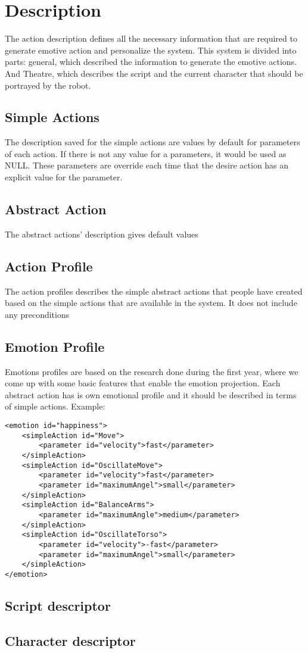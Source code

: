 \section{Description}
The action description defines all the necessary information that are required to generate emotive action and personalize the system. This system is divided into parts: general, which described the information to generate the emotive actions. And Theatre, which describes the script and the current character that should be portrayed by the robot.
\subsection{Simple Actions}
The description saved for the simple actions are values by default for parameters of each action. If there is not any value for a parameters, it would be used as NULL. These parameters are override each time that the desire action has an explicit value for the parameter.
\subsection{Abstract Action}
The abstract actions' description gives default values 
\subsection{Action Profile}
The action profiles describes the simple abstract actions that people have created based on the simple actions that are available in the system. It does not include any preconditions 
\subsection{Emotion Profile}
Emotions profiles are based on the research done during the first year, where we come up with some basic features that enable the emotion projection. Each abstract action has is own emotional profile and it should be described in terms of simple actions. Example:
\begin{verbatim}
<emotion id="happiness">
    <simpleAction id="Move">
		<parameter id="velocity">fast</parameter>    
    </simpleAction>
    <simpleAction id="OscillateMove">
        <parameter id="velocity">fast</parameter>
        <parameter id="maximumAngel">small</parameter>
    </simpleAction>
    <simpleAction id="BalanceArms">
        <parameter id="maximumAngle">medium</parameter>    
    </simpleAction>
    <simpleAction id="OscillateTorso">
        <parameter id="velocity">-fast</parameter>
        <parameter id="maximumAngel">small</parameter>
    </simpleAction>
</emotion>
\end{verbatim}
\subsection{Script descriptor}
\subsection{Character descriptor}